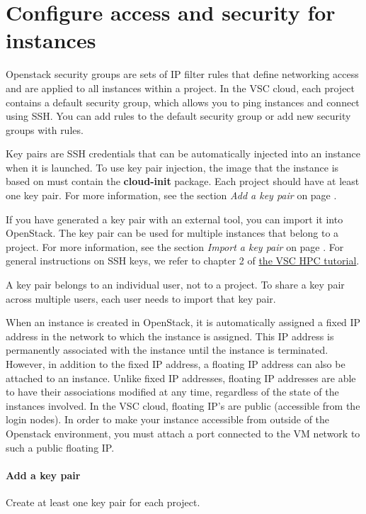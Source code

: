 \chapter{Configure access and security for instances}
Openstack security groups are sets of IP filter rules that define
networking access and are applied to all instances within a project.
In the VSC cloud, each project contains a default security group,
which allows you to ping instances and connect using SSH.  You can add
rules to the default security group or add new security groups with
rules.

Key pairs are SSH credentials that can be automatically injected into
an instance when it is launched. To use key pair injection, the image
that the instance is based on must contain the \textbf{cloud-init}
package. Each project should have at least one key pair. For more
information, see the section \emph{Add a key pair} on page
\pageref{add-a-key-pair}.

If you have generated a key pair with an external tool, you can import
it into \gls{OpenStack}. The key pair can be used for multiple
instances that belong to a project. For more information, see the
section {\emph{Import a key pair}} on page
\pageref{import-a-key-pair}.  For general instructions on SSH keys, we
refer to chapter 2 of
\href{https://www.vscentrum.be/support/tut-book/vsc-tutorials}{the VSC
  HPC tutorial}.

 A key pair belongs to an individual user, not to a
project. To share a key pair across multiple users, each user needs to
import that key pair.

When an instance is created in \gls{OpenStack}, it is automatically
assigned a fixed IP address in the network to which the instance is
assigned. This IP address is permanently associated with the instance
until the instance is terminated. However, in addition to the fixed IP
address, a floating IP address can also be attached to an
instance. Unlike fixed IP addresses, floating IP addresses are able to
have their associations modified at any time, regardless of the state
of the instances involved.  In the VSC cloud, floating IP's are public
(accessible from the login nodes).  In order to make your instance
accessible from outside of the Openstack environment, you must attach
a port connected to the VM network to such a public floating IP.

\subsubsection{Add a key pair}\label{add-a-key-pair}
Create at least one key pair for each project.

